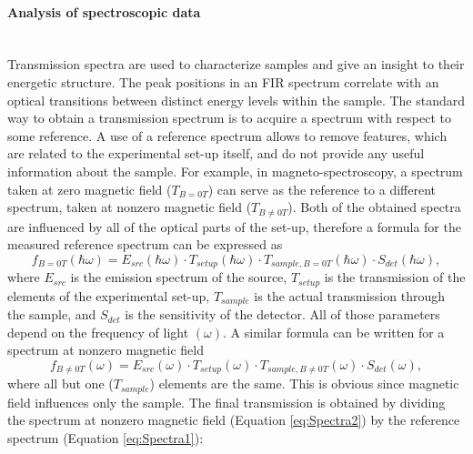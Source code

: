 \documentclass[titlepage,a4paper]{book}
\newcommand{\wciecie}{\quad\phantom{v}}
\newcommand{\myparagraph}[1]{\paragraph{#1}\mbox{}\\}
\begin{document}
\myparagraph{Analysis of spectroscopic data}
\wciecie
Transmission spectra are used to characterize samples and give an insight to their energetic structure. The peak positions in an FIR spectrum correlate with an optical transitions between distinct energy levels within the sample. The standard way to obtain a transmission spectrum is to acquire a spectrum with respect to some reference. A use of a reference spectrum allows to remove features, which are related to the experimental set-up itself, and do not provide any useful information about the sample. For example, in magneto-spectroscopy, a spectrum taken at zero magnetic field ($T_{B=0T}$) can serve as the reference to a different spectrum, taken at nonzero magnetic field ($T_{B\neq 0T}$). Both of the obtained spectra are influenced by all of the optical parts of the set-up, therefore a formula for the measured reference spectrum can be expressed as 
\begin{equation}
\label{eq:Spectra1}
f_{B=0T}(\hbar\omega) = E_{src}(\hbar\omega)\cdot T_{setup}(\hbar\omega)\cdot T_{sample,B=0T}(\hbar\omega)\cdot S_{det}(\hbar\omega),
\end{equation}
where $E_{src}$ is the emission spectrum of the source, $T_{setup}$ is the transmission of the elements of the experimental set-up, $T_{sample}$ is the actual transmission through the sample, and $S_{det}$ is the sensitivity of the detector. All of those parameters depend on the frequency of light $(\omega)$. A similar formula can be written for a spectrum at nonzero magnetic field
\begin{equation}
\label{eq:Spectra2}
f_{B\neq 0T}(\omega) = E_{src}(\omega)\cdot T_{setup}(\omega)\cdot T_{sample,B\neq 0T}(\omega)\cdot S_{det}(\omega),
\end{equation}
where all but one ($T_{sample}$) elements are the same. This is obvious since magnetic field influences only the sample. The final transmission is obtained by dividing the spectrum at nonzero magnetic field (Equation \ref{eq:Spectra2}) by the reference spectrum (Equation \ref{eq:Spectra1}):
\end{document}
